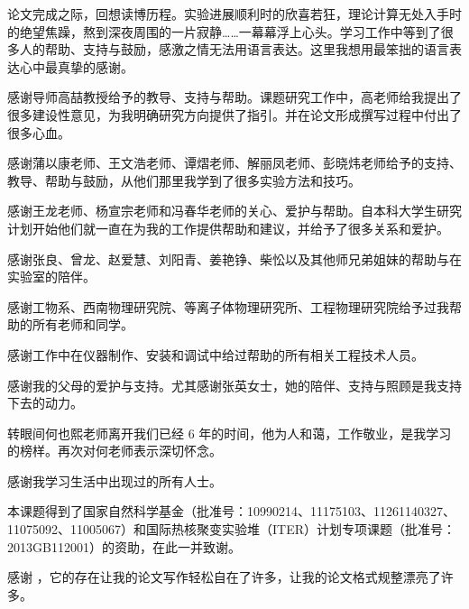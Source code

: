 
\begin{ack}
论文完成之际，回想读博历程。实验进展顺利时的欣喜若狂，理论计算无处入手时的绝望焦躁，熬到深夜周围的一片寂静……一幕幕浮上心头。学习工作中等到了很多人的帮助、支持与鼓励，感激之情无法用语言表达。这里我想用最笨拙的语言表达心中最真挚的感谢。

感谢导师高喆教授给予的教导、支持与帮助。课题研究工作中，高老师给我提出了很多建设性意见，为我明确研究方向提供了指引。并在论文形成撰写过程中付出了很多心血。

感谢蒲以康老师、王文浩老师、谭熠老师、解丽凤老师、彭晓炜老师给予的支持、教导、帮助与鼓励，从他们那里我学到了很多实验方法和技巧。

感谢王龙老师、杨宣宗老师和冯春华老师的关心、爱护与帮助。自本科大学生研究计划开始他们就一直在为我的工作提供帮助和建议，并给予了很多关系和爱护。

感谢张良、曾龙、赵爱慧、刘阳青、姜艳铮、柴忪以及其他师兄弟姐妹的帮助与在实验室的陪伴。

感谢工物系、西南物理研究院、等离子体物理研究所、工程物理研究院给予过我帮助的所有老师和同学。

感谢工作中在仪器制作、安装和调试中给过帮助的所有相关工程技术人员。

感谢我的父母的爱护与支持。尤其感谢张英女士，她的陪伴、支持与照顾是我支持下去的动力。

转眼间何也熙老师离开我们已经 6 年的时间，他为人和蔼，工作敬业，是我学习的榜样。再次对何老师表示深切怀念。

感谢我学习生活中出现过的所有人士。

本课题得到了国家自然科学基金（批准号：10990214、11175103、11261140327、11075092、11005067）和国际热核聚变实验堆（ITER）计划专项课题（批准号：2013GB112001）的资助，在此一并致谢。

感谢 \thuthesis，它的存在让我的论文写作轻松自在了许多，让我的论文格式规整漂亮了许多。
\end{ack}
